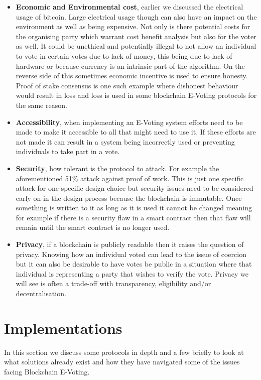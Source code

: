 \documentclass{llncs}
\begin{document}
\begin{itemize}
    \item \textbf{Economic and Environmental cost}, earlier we discussed the electrical usage of bitcoin. Large electrical usage though can also have an impact on the environment as well as being expensive. Not only is there potential costs for the organising party which warrant cost benefit analysis but also for the voter as well. It could be unethical and potentially illegal to not allow an individual to vote in certain votes due to lack of money, this being due to lack of hardware or because currency is an intrinsic part of the algorithm\cite{zhao2015vote}. On the reverse side of this sometimes economic incentive is used to ensure honesty. Proof of stake consensus is one such example where dishonest behaviour would result in loss and loss is used in some blockchain E-Voting protocols for the same reason\cite{zhao2015vote}\cite{boardroom2017ncl}.
    \item \textbf{Accessibility}, when implementing an E-Voting system efforts need to be made to make it accessible to all that might need to use it. If these efforts are not made it can result in a system being incorrectly used or preventing individuals to take part in a vote. 
    \item \textbf{Security}, how tolerant is the protocol to attack. For example the aforementioned 51\% attack against proof of work. This is just one specific attack for one specific design choice but security issues need to be considered early on in the design process because the blockchain is immutable. Once something is written to it as long as it is used it cannot be changed meaning for example if there is a security flaw in a smart contract then that flaw will remain until the smart contract is no longer used.
    \item \textbf{Privacy}, if a blockchain is publicly readable then it raises the question of privacy. Knowing how an individual voted can lead to the issue of coercion but it can also be desirable to have votes be public in a situation where that individual is representing a party that wishes to verify the vote. Privacy we will see is often a trade-off with transparency, eligibility and/or decentralisation.
\end{itemize}

\section{Implementations}
In this section we discuss some protocols in depth and a few briefly to look at what solutions already exist and how they have navigated some of the issues facing Blockchain E-Voting.
\end{document}
